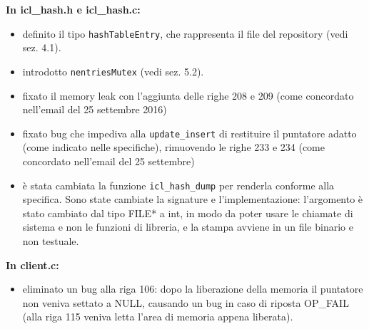 \documentclass[a4paper,12pt]{article}
\begin{document}
\textbf{ In icl\_hash.h e icl\_hash.c: }
\begin{itemize}
\item definito il tipo \texttt{hashTableEntry}, che rappresenta il file del repository (vedi sez. 4.1).
\item introdotto \texttt{nentriesMutex} (vedi sez. 5.2).
\item fixato il memory leak con l'aggiunta delle righe 208 e 209 (come concordato nell'email del 25 settembre 2016)
\item fixato bug che impediva alla \texttt{update\_insert} di restituire il puntatore adatto (come indicato nelle specifiche), rimuovendo le righe 233 e 234 (come concordato nell'email del 25 settembre)
\item è stata cambiata la funzione \texttt{icl\_hash\_dump} per renderla conforme alla specifica. Sono state cambiate la signature e l'implementazione: l'argomento è stato cambiato dal tipo FILE* a int, in modo da poter usare le chiamate di sistema e non le funzioni di libreria, e la stampa avviene in un file binario e non testuale.
\end{itemize}

\textbf{In client.c:}
\begin{itemize}
 \item eliminato un bug alla riga 106: dopo la liberazione della memoria il puntatore non veniva settato a NULL, causando un bug in caso di riposta OP\_FAIL (alla riga 115 veniva letta l'area di memoria appena liberata).
\end{itemize}
\end{document}
